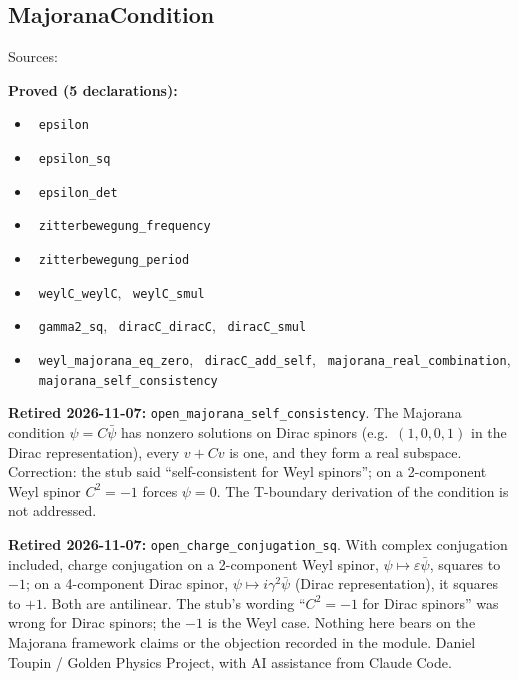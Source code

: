 \documentclass{report}
\theoremstyle{definition}
\begin{document}
\begin{itemize}
\begin{itemize}
\subsection{MajoranaCondition}
Sources:

\noindent\textbf{Proved (5 declarations):}
\begin{itemize}
  \item {}\leanok\ \texttt{epsilon}
  \item {}\leanok\ \texttt{epsilon\_sq}
  \item {}\leanok\ \texttt{epsilon\_det}
  \item {}\leanok\ \texttt{zitterbewegung\_frequency}
  \item {}\leanok\ \texttt{zitterbewegung\_period}
  \item {}\leanok\ \texttt{weylC\_weylC}, \leanok\ \texttt{weylC\_smul}
  \item {}\leanok\ \texttt{gamma2\_sq}, \leanok\ \texttt{diracC\_diracC}, \leanok\ \texttt{diracC\_smul}
  \item {}\leanok\ \texttt{weyl\_majorana\_eq\_zero}, \leanok\ \texttt{diracC\_add\_self}, \leanok\ \texttt{majorana\_real\_combination}, \leanok\ \texttt{majorana\_self\_consistency}
\end{itemize}
\noindent\textbf{Retired 2026-11-07:} \texttt{open\_majorana\_self\_consistency}. The Majorana condition $\psi=C\bar\psi$ has nonzero solutions on Dirac spinors (e.g.\ $(1,0,0,1)$ in the Dirac representation), every $v+Cv$ is one, and they form a real subspace. Correction: the stub said ``self-consistent for Weyl spinors''; on a 2-component Weyl spinor $C^2=-1$ forces $\psi=0$. The T-boundary derivation of the condition is not addressed.

\noindent\textbf{Retired 2026-11-07:} \texttt{open\_charge\_conjugation\_sq}. With complex conjugation included, charge conjugation on a 2-component Weyl spinor, $\psi\mapsto\varepsilon\bar\psi$, squares to $-1$; on a 4-component Dirac spinor, $\psi\mapsto i\gamma^2\bar\psi$ (Dirac representation), it squares to $+1$. Both are antilinear. The stub's wording ``$C^2=-1$ for Dirac spinors'' was wrong for Dirac spinors; the $-1$ is the Weyl case. Nothing here bears on the Majorana framework claims or the objection recorded in the module.
Daniel Toupin / Golden Physics Project, with AI assistance from Claude Code.


\end{itemize}
\end{itemize}
\end{document}
